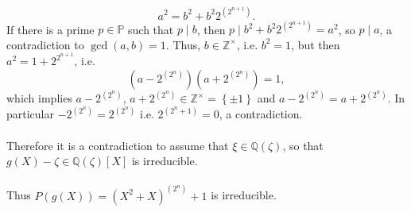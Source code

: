 \begin{solution}
    \[
        a^2 = b^2 + b^2 2^{\left(2^{n+1}\right)}.
    \]
    If there is a prime \( p \in \mathbb{P} \) such that \( p \mid b \), then \( p \mid b^2 + b^2 2^{\left(2^{n+1}\right)} = a^2 \), so \( p \mid a \), a contradiction to \( \gcd\left(a, b\right) = 1 \). Thus, \( b \in \mathbb{Z}^{\times} \), i.e. \( b^2 = 1 \), but then \( a^2 = 1 + 2^{2^{n+1}} \), i.e.
    \[
        \left( a - 2^{\left(2^{n}\right)} \right)\left( a + 2^{\left(2^{n}\right)} \right) = 1,
    \]
    which implies \( a - 2^{\left(2^{n}\right)},\, a + 2^{\left(2^{n}\right)} \in \mathbb{Z}^{\times} = \left\{ \pm 1 \right\} \) and \( a - 2^{\left(2^{n}\right)}=a + 2^{\left(2^{n}\right)} \). In particular \( -2^{\left(2^{n}\right)} = 2^{\left(2^{n}\right)} \) i.e. \( 2^{\left(2^{n}+1\right)} = 0 \), a contradiction.
    \\\\
    Therefore it is a contradiction to assume that \( \xi\in\mathbb{Q}\left(\zeta\right) \), so that \( g\left(X\right)-\zeta\in\mathbb{Q}\left(\zeta\right)\left[X\right] \) is irreducible.
    \\\\
    Thus \( P\left(g\left(X\right)\right)=\left(X^2+X\right)^{\left(2^{n}\right)}+1 \) is irreducible.
    \\\\
\end{solution}
